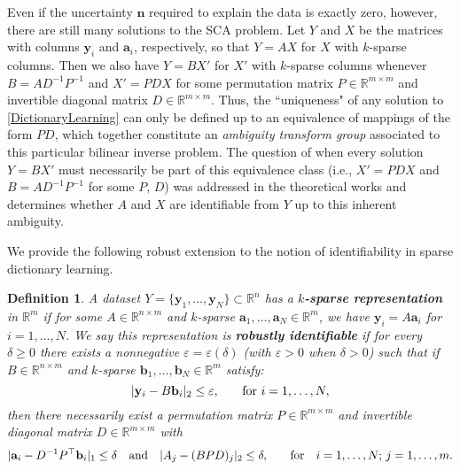 \documentclass[journal, onecolumn]{IEEEtran}
\newtheorem{definition}{Definition}
\begin{document}
Even if the uncertainty $\mathbf{n}$ required to explain the data is exactly zero, however, there are still many solutions to the SCA problem. Let $Y$ and $X$ be the matrices with columns $\mathbf{y}_i$ and $\mathbf{a}_i$, respectively, so that $Y = AX$ for $X$ with $k$-sparse columns. Then we also have $Y = BX'$ for $X'$ with $k$-sparse columns whenever $B = AD^{-1}P^{-1}$ and $X' = PDX$ for some permutation matrix $P \in \mathbb{R}^{m \times m}$ and invertible diagonal matrix $D \in \mathbb{R}^{m \times m}$. Thus, the ``uniqueness" of any solution to \eqref{DictionaryLearning} can only be defined up to an equivalence of mappings of the form $PD$, which together constitute an \emph{ambiguity transform group} \cite{BilinInv} associated to this particular bilinear inverse problem. The question of when every solution $Y = BX'$ must necessarily be part of this equivalence class (i.e., $X' = PDX$ and $B = AD^{-1}P^{-1}$ for some $P$, $D$) was addressed in the theoretical works \cite{Georgiev05, Aharon06, Hillar15} and determines whether $A$ and $X$ are identifiable from $Y$ up to this inherent ambiguity.

We provide the following robust extension to the notion of identifiability in sparse dictionary learning.

\begin{definition}\label{Uniqueness}
A dataset $Y = \{\mathbf{y}_1, \ldots, \mathbf{y}_N\} \subset \mathbb{R}^n$ has a \textbf{$k$-sparse representation} in $\mathbb{R}^m$ if for some $A \in \mathbb{R}^{n \times m}$ and $k$-sparse $\mathbf{a}_1, \ldots, \mathbf{a}_N \in \mathbb{R}^m$, we have $\mathbf{y}_i = A\mathbf{a}_i$ for $i = 1, \ldots, N$. We say this representation is \textbf{robustly identifiable} if for every $\delta \geq 0$ there exists a nonnegative $\varepsilon = \varepsilon(\delta)$ (with $\varepsilon > 0$ when $\delta > 0$) such that if $B \in \mathbb{R}^{n \times m}$ and $k$-sparse $\mathbf{b}_1, \ldots, \mathbf{b}_N \in \mathbb{R}^m$ satisfy:
\[|\mathbf{y}_i - B\mathbf{b}_i|_2 \leq \varepsilon,\indent \text{ for } i = 1, \ldots, N,\]
%
then there necessarily exist a permutation matrix $P \in \mathbb{R}^{m \times m}$ and invertible diagonal matrix $D \in \mathbb{R}^{m \times m}$ with
\begin{align}\label{def1}
|\mathbf{a}_i - D^{-1}P^{\top}\mathbf{b}_i|_1 \leq \delta \ \ \text{ and } \ \ |A_j - (BPD)_j|_2 \leq \delta,\indent  \text{ for } \ \ i = 1, \ldots, N; \, j = 1, \ldots, m.
\end{align}
\end{definition}
\end{document}
